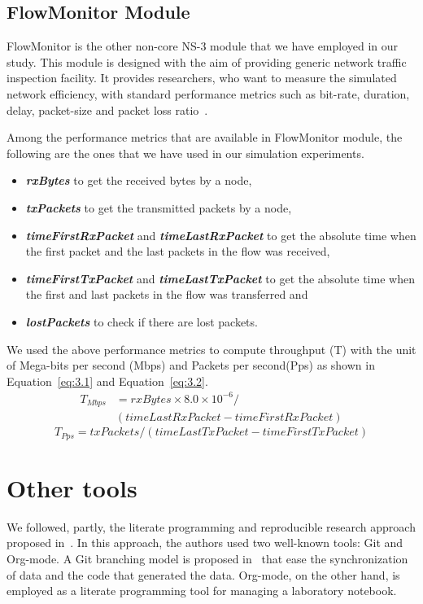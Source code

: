 \subsection{FlowMonitor Module}
FlowMonitor is the other non-core NS-3 module that we have employed in our study. This module is designed with the aim of providing generic network traffic inspection facility. It provides researchers, who want to measure the simulated network efficiency, with standard performance metrics such as bit-rate, duration, delay, packet-size and packet loss ratio~\cite{DBLP:conf/valuetools/CarneiroFR09}.  

Among the performance metrics that are available in FlowMonitor module, the following are the ones that we have used in our simulation experiments.
\begin{itemize}
	\item \textbf{\textit{rxBytes}} to get the received bytes by a node,
	\item \textbf{\textit{txPackets}} to get the transmitted packets by a node,
	\item \textbf{\textit{timeFirstRxPacket}} and \textbf{\textit{timeLastRxPacket}} to get the absolute time when the first packet and the last packets in the flow was received,
	\item  \textbf{\textit{timeFirstTxPacket}} and \textbf{\textit{timeLastTxPacket}} to get the absolute time when the first and last packets in the flow was transferred and 
	\item \textbf{\textit{lostPackets}} to check if there are lost packets.
\end{itemize}
We used the above performance metrics to compute throughput (T) with the unit of Mega-bits per second (Mbps) and Packets per second(Pps) as shown in Equation~\ref{eq:3.1} and Equation~\ref{eq:3.2}. 
\begin{equation} \label{eq:3.1}
\begin{split}
T_{Mbps} &= rxBytes \times 8.0 \times 10^{-6} /\\
  & (timeLastRxPacket - timeFirstRxPacket)
\end{split}
\end{equation}
\begin{equation} \label{eq:3.2}
T_{Pps} = txPackets / (timeLastTxPacket - timeFirstTxPacket)
\end{equation}
\section{Other tools}
We followed, partly, the literate programming and reproducible research approach proposed in~\cite{DBLP:journals/sigops/StanisicLD15,schulte2012multi}. In this approach, the authors used two well-known tools: Git and Org-mode. A Git branching model is proposed in~\cite{DBLP:journals/sigops/StanisicLD15} that ease the synchronization of data and the code that generated the data. Org-mode, on the other hand, is employed as a literate programming tool for managing a laboratory notebook.  

